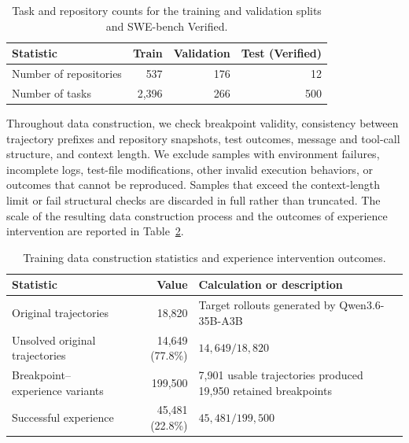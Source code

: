 \begin{table}[tb]
    \centering
    \caption{Task and repository counts for the training and validation splits and SWE-bench Verified.}
    \label{tab:data-splits}
    \begin{tabular}{lrrr}
        \toprule
        \textbf{Statistic} &
        \textbf{Train} &
        \textbf{Validation} &
        \textbf{Test (Verified)} \\
        \midrule
        Number of repositories & 537   & 176 & 12  \\
        Number of tasks        & 2,396 & 266 & 500 \\
        \bottomrule
    \end{tabular}
\end{table}

Throughout data construction, we check breakpoint validity, consistency
between trajectory prefixes and repository snapshots, test outcomes,
message and tool-call structure, and context length. We exclude samples
with environment failures, incomplete logs, test-file modifications,
other invalid execution behaviors, or outcomes that cannot be
reproduced. Samples that exceed the context-length limit or fail
structural checks are discarded in full rather than truncated. The scale of the resulting data construction process and the outcomes of experience intervention are reported in Table~\ref{tab:construction-statistics}.

\begin{table}[tb]
    \centering
    \caption{Training data construction statistics and experience intervention outcomes.}
    \label{tab:construction-statistics}
    \begin{tabular}{p{} r p{}}
        \toprule
        \textbf{Statistic} &
        \textbf{Value} &
        \textbf{Calculation or description} \\
        \midrule
        Original trajectories
        &
        18,820
        &
        Target rollouts generated by Qwen3.6-35B-A3B
        \\

        Unsolved original trajectories
        &
        14,649 (77.8\%)
        &
        \(14{,}649 / 18{,}820\)
        \\

        Breakpoint--experience variants
        &
        199,500
        &
        7,901 usable trajectories produced 19,950 retained breakpoints
        \\

        Successful experience
        &
        45,481 (22.8\%)
        &
        \(45{,}481 / 199{,}500\)
        \\
        \bottomrule
    \end{tabular}
\end{table}

